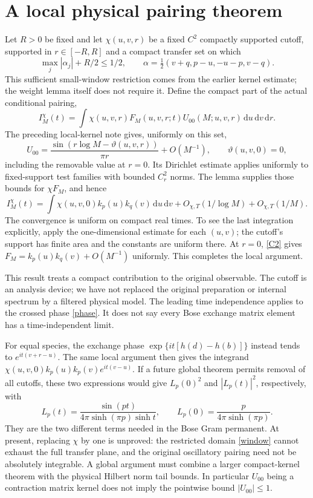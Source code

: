 \documentclass[11pt,a4paper]{article}
\newcommand{\dd}{\,\mathrm d}
\begin{document}
\newpage
\section{A local physical pairing theorem}
Let $R>0$ be fixed and let $\chi(u,v,r)$ be a fixed $C^2$ compactly
supported cutoff, supported in $r\in[-R,R]$ and a compact transfer set
on which
\begin{equation}
 \max_j|\alpha_j|+R/2\le1/2,\qquad
 \alpha=\tfrac12(v+q,p-u,-u-p,v-q).                 \label{window}
\end{equation}
This sufficient small-window restriction comes from the earlier kernel
estimate; the weight lemma itself does not require it.
Define the compact part of the actual conditional pairing,
\[
 I_M^\chi(t)=\int\chi(u,v,r)F_M(u,v,r;t)
                   U_{00}(M;u,v,r)\dd u\dd v\dd r .
\]
The preceding local-kernel note \cite{local} gives, uniformly on this set,
\[
 U_{00}=\frac{\sin(r\log M-\vartheta(u,v,r))}{\pi r}
                +O(M^{-1}),\qquad \vartheta(u,v,0)=0 ,
\]
including the removable value at $r=0$. Its Dirichlet estimate applies
uniformly to fixed-support test families with bounded $C^2_r$ norms.
The lemma supplies those bounds for $\chi F_M$, and hence
\begin{equation}
 I_M^\chi(t)=
 \int \chi(u,v,0)k_p(u)k_q(v)\dd u\dd v
 +O_{\chi,T}(1/\log M)+O_{\chi,T}(1/M).            \label{physical}
\end{equation}
The convergence is uniform on compact real times.
To see the last integration explicitly, apply the one-dimensional
estimate for each $(u,v)$; the cutoff's support has finite area and the
constants are uniform there. At $r=0$, \eqref{C2} gives
$F_M=k_p(u)k_q(v)+O(M^{-1})$ uniformly. This completes the local argument.

This result treats a compact contribution to the original observable.
The cutoff is an analysis device; we have not replaced the original
preparation or internal spectrum by a filtered physical model.
The leading time independence applies to the crossed phase
\eqref{phase}. It does not say every Bose exchange matrix element has
a time-independent limit.

For equal species, the exchange phase
$\exp\{it[h(d)-h(b)]\}$ instead tends to $e^{it(v+r-u)}$.
The same local argument then gives the integrand
$\chi(u,v,0)k_p(u)k_p(v)e^{it(v-u)}$.
If a future global theorem permits removal of all cutoffs, these two
expressions would give $L_p(0)^2$ and $|L_p(t)|^2$, respectively, with
\[
 L_p(t)=\frac{\sin(pt)}{4\pi\sinh(\pi p)\sinh t},
 \qquad L_p(0)=\frac{p}{4\pi\sinh(\pi p)}.
\]
They are the two different terms needed in the Bose Gram permanent.
At present, replacing $\chi$ by one is unproved: the restricted domain
\eqref{window} cannot exhaust the full transfer plane, and the original
oscillatory pairing need not be absolutely integrable. A global argument
must combine a larger compact-kernel theorem with the physical Hilbert
norm tail bounds. In particular $U_{00}$ being a contraction matrix
kernel does not imply the pointwise bound $|U_{00}|\le1$.
\end{document}
